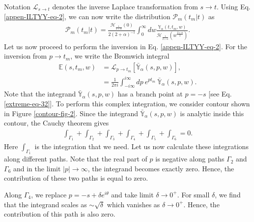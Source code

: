 \documentclass[superscriptaddress,amsmath,amssymb,aps,onecolumn]{revtex4}
\begin{document}
Notation $\mathcal{L}_{s \to t}$ denotes the inverse Laplace transformation from $s \to t$. Using Eq. \eqref{appen-ILTYY-eq-2}, we can now write the distribution $\mathcal{P}_m(t_m|t)$ as
\begin{align}
\mathcal{P}_m(t_m|t) = \frac{ \mathcal{H}_{\frac{1}{2+\alpha}} \left(0 \right) }{2 (2+\alpha)^{-1}} \int _{0}^{\infty} dw \frac{\mathbb{Y}_{\alpha} \left(t,t_m,w \right)}{\mathcal{H}_{\frac{1}{2+\alpha}} \left(w^{\frac{2+\alpha}{2}} \right)}.
\label{appen-ILTYY-eq-1}
\end{align}  
Let us now proceed to perform the inversion in Eq. \eqref{appen-ILTYY-eq-2}. For the inversion from $p \to t_m$, we write the Bromwich integral
\begin{align}
\mathbb{E}(s,t_m,w) &= \mathcal{L}_{p \to t_m} \left[ \bar{\mathbb{Y}}_{\alpha} \left(s,p,w \right) \right], \label{appen-ILTYY-eq-3}\\
& =\frac{1}{2 \pi i} \int _{-i \infty}^{i \infty} dp~ e^{p t_m}~ \bar{\mathbb{Y}}_{\alpha} \left(s,p,w \right) \label{appen-ILTYY-eq-4}.
\end{align}
Note that the integrand $\bar{\mathbb{Y}}_{\alpha} \left(s,p,w \right)$ has a branch point at $p=-s$ [see Eq. \eqref{extreme-eq-32}]. To perform this complex integration, we consider contour shown in Figure \ref{contour-fig-2}. Since the integrand $\bar{\mathbb{Y}}_{\alpha} \left(s,p,w \right)$ is analytic inside this contour, the Cauchy theorem gives
\begin{align}
\int _{\Gamma _1}+\int _{\Gamma _2}+\int _{\Gamma _3}+\int _{\Gamma _4}+\int _{\Gamma _5}+\int _{\Gamma _6} =0. 
\label{appen-ILTYY-eq-5}
\end{align}
Here $\int _{\Gamma _1}$ is the integration that we need. Let us now calculate these integrations along different paths. Note that the real part of $p$ is negative along paths $\Gamma_2$ and $\Gamma _6$ and in the limit $|p| \to \infty$, the integrand becomes exactly zero. Hence, the contribution of these two paths is equal to zero.

Along $\Gamma _4$, we replace $p=-s + \delta e^{i \theta}$ and take limit $\delta \to 0^+$. For small $\delta$, we find that the integrand scales as $\sim \sqrt{\delta}$ which vanishes as $\delta \to 0^+$. Hence, the contribution of this path is also zero. 
\end{document}
